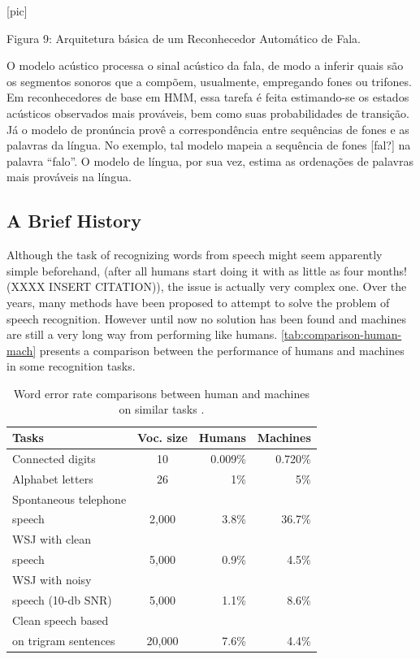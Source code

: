                                 [pic]

 Figura 9: Arquitetura b\'asica de um Reconhecedor Autom\'atico de Fala.

O modelo ac\'ustico processa o sinal ac\'ustico da fala, de modo a inferir
quais s\~ao os segmentos sonoros que a comp\~oem, usualmente, empregando
fones ou trifones. Em reconhecedores de base em HMM, essa tarefa \'e feita
estimando-se os estados ac\'usticos observados mais prov\'aveis, bem como
suas probabilidades de transi\c{c}\~ao. J\'a o modelo de pron\'uncia prov\^e a
correspond\^encia entre sequ\^encias de fones e as palavras da l\'ingua. No
exemplo, tal modelo mapeia a sequ\^encia de fones {[}fal?{]} na palavra
``falo''. O modelo de l\'ingua, por sua vez, estima as ordena\c{c}\~oes de
palavras mais prov\'aveis na l\'ingua.

\subsection{A Brief History}

Although the task of recognizing words from speech might seem apparently simple beforehand,
(after all humans start doing it with as little as four months! (XXXX INSERT CITATION)),
the issue is actually very complex one. Over the years, many methods have been 
proposed to attempt to solve the problem of speech recognition. However until now no solution has been found and machines are still
a very long way from performing like humans. \autoref{tab:comparison-human-mach} presents a comparison between the performance
of humans and machines in some recognition tasks.

\begin{table}[!ht]
  \caption[Word error rate comparisons between human and machines on similar tasks \citep{Huang2001}.]{Word error rate comparisons between human and machines on similar tasks \citep{Huang2001}.}
  \smallskip
  \centering
  \begin{tabular}{lcrr} \toprule
      \textbf{Tasks} & \textbf{Voc. size} & \textbf{Humans} & \textbf{Machines} \\ \midrule
      \small Connected digits & 10 & 0.009\% & 0.720\% \\
      \small Alphabet letters & 26 & 1\% & 5\% \\
      \small Spontaneous telephone \\ speech & 2,000 & 3.8\% & 36.7\% \\
      \small WSJ with clean \\ \small speech & 5,000 & 0.9\% & 4.5\% \\
      \small WSJ with noisy \\ \small speech (10-db SNR) & 5,000 & 1.1\% & 8.6\% \\
      \small Clean speech based \\ \small on trigram sentences & 20,000 & 7.6\% & 4.4\% \\
    \bottomrule
  \end{tabular}
  \label{tab:comparison-human-mach}
\end{table}

